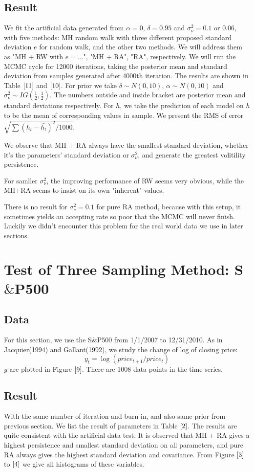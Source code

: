 \documentclass{article}
\begin{document}
\subsection{Result}
We fit the artificial data generated from $\alpha=0$, $\delta=0.95$ and $\sigma_\nu^2=0.1$ or $0.06$, with five methods: MH random walk with three different proposed standard deviation $e$ for random walk, and the other two methods. We will address them as "MH $+$ RW with $e=\dots$", "MH $+$ RA", "RA", respectively. We will run the MCMC cycle for 12000 iterations, taking the posterior mean and standard deviation from samples generated after 4000th iteration. The results are shown in Table $\ref{11}$ and $\ref{10}$. For prior we take $\delta\sim N(0,10)$, $\alpha\sim N(0,10)$ and $\sigma_\nu^2\sim IG(\frac{1}{2},\frac{1}{2})$. The numbers outside and inside bracket are posterior mean and standard deviations respectively. For $h$, we take the prediction of each model on $h$ to be the mean of corresponding values in sample. We present the RMS of error $\sqrt{\sum(h_t-\bar{h_t})^2/1000}$.

We observe that MH $+$ RA always have the smallest standard deviation, whether it's the parameters' standard deviation or $\sigma_\nu^2$, and generate the greatest volitility persistence. 

For samller $\sigma_\nu^2$, the improving performance of RW seems very obvious, while the MH$+$RA seems to insist on its own "inherent" values.

There is no result for $\sigma_\nu^2=0.1$ for pure RA method, because with this setup, it sometimes yields an accepting rate so poor that the MCMC will never finish. Luckily we didn't encounter this problem for the real world data we use in later sections.

\section{Test of Three Sampling Method: S$\&$P500}
\subsection{Data}
For this section, we use the S$\&$P500 from 1/1/2007 to 12/31/2010. As in Jacquier(1994) and Gallant(1992), we study the change of log of closing price:
\[
y_t=\log(price_{t+1}/price_t)
\]
$y$ are plotted in Figure $\ref{9}$. There are 1008 data points in the time series.

\subsection{Result}
With the same number of iteration and burn-in, and also same prior from previous section. We list the result of parameters in Table $\ref{2}$. The results are quite consistent with the artificial data test. It is observed that MH $+$ RA gives a highest persistence and smallest standard deviation on all parameters, and pure RA always gives the highest standard deviation and covariance. From Figure $\ref{3}$ to $\ref{4}$ we give all histograms of these variables.
\end{document}
